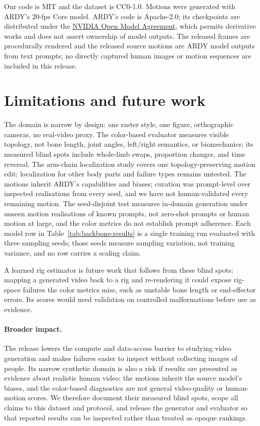 \documentclass[10pt,twocolumn,letterpaper]{article}
\begin{document}
Our code is MIT and the dataset is CC0-1.0. Motions were generated with ARDY's 20-fps Core model. ARDY's
code is Apache-2.0; its checkpoints are distributed under the
\href{https://www.nvidia.com/en-us/agreements/enterprise-software/nvidia-open-model-agreement/}{\color{black}NVIDIA Open
Model Agreement}, which permits derivative works and does not assert ownership of model outputs. The released
frames are procedurally rendered and the released source motions are ARDY model outputs from text prompts; no
directly captured human images or motion sequences are included in this release.

\section{Limitations and future work}\label{sec:future}
The domain is narrow by design: one raster style, one figure, orthographic cameras, no real-video proxy. The
color-based evaluator measures visible topology, not bone
length, joint angles, left/right semantics, or biomechanics; its measured blind spots include whole-limb
swaps, proportion changes, and time reversal. The arm-chain localization study covers one topology-preserving motion edit; localization for other body
parts and failure types remains untested. The
motions inherit ARDY's capabilities and biases; curation
was prompt-level over inspected realisations from every seed, and we have not human-validated every remaining
motion. The seed-disjoint test measures in-domain generation under unseen motion realisations of known
prompts, not zero-shot prompts or human motion at large, and the color metrics do not establish prompt
adherence. Each model row in Table~\ref{tab:backbone-results} is a single training run evaluated with three
sampling seeds; those seeds measure sampling variation, not training variance, and no row carries a scaling claim.

A learned rig estimator is future work that follows from these blind spots: mapping a generated video back to
a rig and re-rendering it could expose rig-space failures the color metrics miss, such as unstable bone
length or end-effector errors. Its scores would need validation on controlled malformations before use as
evidence.

\paragraph{Broader impact.}
The release lowers the compute and data-access barrier to studying video generation and makes failures easier
to inspect without collecting images of people. Its narrow synthetic domain is also a risk if results are
presented as evidence about realistic human video: the motions inherit the source model's biases, and the
color-based diagnostics are not general video-quality or human-motion scores. We therefore document their
measured blind spots, scope all claims to this dataset and protocol, and release the generator and evaluator so
that reported results can be inspected rather than treated as opaque rankings.
\end{document}
